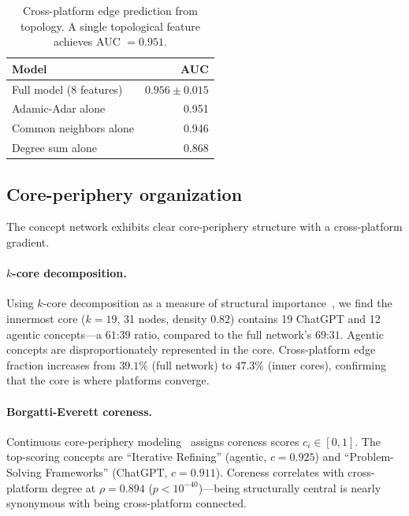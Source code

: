 \documentclass[11pt,twocolumn]{article}
\begin{document}
\begin{table}[t]
  \centering
  \caption{Cross-platform edge prediction from topology.  A single topological feature achieves AUC $= 0.951$.}
  \label{tab:prediction}
  \begin{tabular}{lr}
    \toprule
    Model & AUC \\
    \midrule
    Full model (8 features) & $0.956 \pm 0.015$ \\
    Adamic-Adar alone & 0.951 \\
    Common neighbors alone & 0.946 \\
    Degree sum alone & 0.868 \\
    \bottomrule
  \end{tabular}
\end{table}


\subsection{Core-periphery organization}
\label{sec:results:core}

The concept network exhibits clear core-periphery structure with a cross-platform gradient.

\paragraph{$k$-core decomposition.}
Using $k$-core decomposition as a measure of structural importance~\citep{kitsak2010identification}, we find the innermost core ($k = 19$, 31 nodes, density $0.82$) contains 19 ChatGPT and 12 agentic concepts---a $61$:$39$ ratio, compared to the full network's $69$:$31$.
Agentic concepts are disproportionately represented in the core.
Cross-platform edge fraction increases from $39.1\%$ (full network) to $47.3\%$ (inner cores), confirming that the core is where platforms converge.

\paragraph{Borgatti-Everett coreness.}
Continuous core-periphery modeling~\citep{borgatti2000models} assigns coreness scores $c_i \in [0, 1]$.
The top-scoring concepts are ``Iterative Refining'' (agentic, $c = 0.925$) and ``Problem-Solving Frameworks'' (ChatGPT, $c = 0.911$).
Coreness correlates with cross-platform degree at $\rho = 0.894$ ($p < 10^{-40}$)---being structurally central is nearly synonymous with being cross-platform connected.
\end{document}
